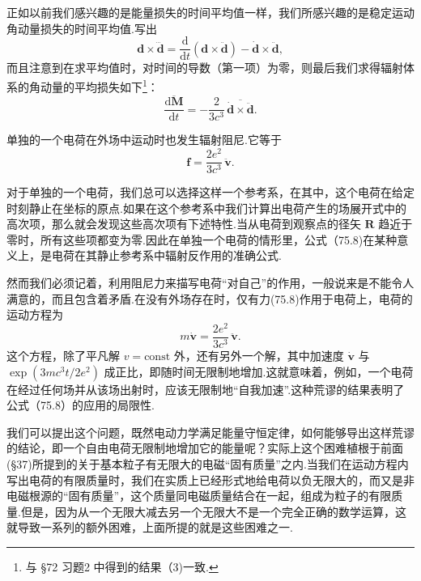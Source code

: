 正如以前我们感兴趣的是能量损失的时间平均值一样，我们所感兴趣的是稳定运动角动量损失的时间平均值.写出
\begin{equation*}
  \boldsymbol{d}\times\dddot{\boldsymbol{d}}
  =\frac{\mathrm{d}}{\mathrm{d}t}(\boldsymbol{d}\times\ddot{\boldsymbol{d}})
  -\dot{\boldsymbol{d}}\times\ddot{\boldsymbol{d}},
\end{equation*}
而且注意到在求平均值时，对时间的导数（第一项）为零，则最后我们求得辐射体系的角动量的平均损失如下\footnote{与 §72 习题2 中得到的结果（3)一致.}：
\begin{equation}
  \overline{\frac{\mathrm{d}\boldsymbol{M}}{\mathrm{d}t}}
  =-\frac{2}{3c^3}\,\overline{\dot{\boldsymbol{d}}\times\ddot{\boldsymbol{d}}}.
\end{equation}

单独的一个电荷在外场中运动时也发生辐射阻尼.它等于
\begin{equation}
  \boldsymbol{f}=\frac{2e^2}{3c^3}\,\ddot{\boldsymbol{v}}.
\end{equation}

对于单独的一个电荷，我们总可以选择这样一个参考系，在其中，这个电荷在给定时刻静止在坐标的原点.如果在这个参考系中我们计算出电荷产生的场展开式中的高次项，那么就会发现这些高次项有下述特性.当从电荷到观察点的径矢 $\boldsymbol{R}$ 趋近于零时，所有这些项都变为零.因此在单独一个电荷的情形里，公式（75.8)在某种意义上，是电荷在其静止参考系中辐射反作用的准确公式.

然而我们必须记着，利用阻尼力来描写电荷“对自己”的作用，一般说来是不能令人满意的，而且包含着矛盾.在没有外场存在时，仅有力(75.8)作用于电荷上，电荷的运动方程为
\begin{equation*}
  m\dot{\boldsymbol{v}}=\frac{2e^2}{3c^3}\,\ddot{\boldsymbol{v}}.
\end{equation*}
这个方程，除了平凡解 $v=\mathrm{const}$ 外，还有另外一个解，其中加速度 $\dot{\boldsymbol{v}}$ 与 $\exp(3mc^3t/2e^2)$ 成正比，即随时间无限制地增加.这就意味着，例如，一个电荷在经过任何场并从该场出射时，应该无限制地“自我加速”.这种荒谬的结果表明了公式（75.8）的应用的局限性.

我们可以提出这个问题，既然电动力学满足能量守恒定律，如何能够导出这样荒谬的结论，即一个自由电荷无限制地增加它的能量呢？实际上这个困难植根于前面(§37)所提到的关于基本粒子有无限大的电磁“固有质量”之内.当我们在运动方程内写出电荷的有限质量时，我们在实质上已经形式地给电荷以负无限大的，而又是非电磁根源的“固有质量”，这个质量同电磁质量结合在一起，组成为粒子的有限质量.但是，因为从一个无限大减去另一个无限大不是一个完全正确的数学运算，这就导致一系列的额外困难，上面所提的就是这些困难之一.

